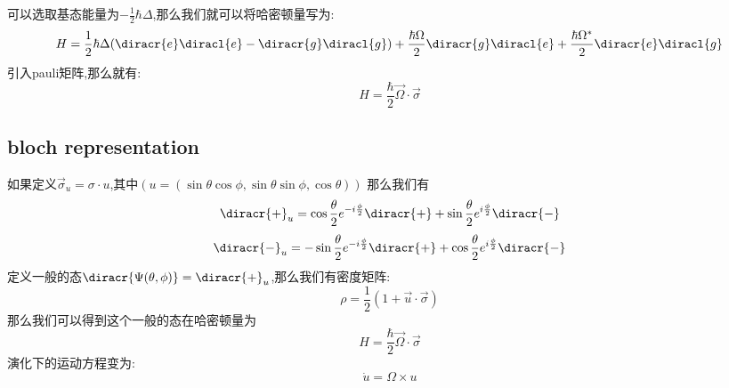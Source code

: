 可以选取基态能量为$-\frac{1}{2}\hbar\Delta$,那么我们就可以将哈密顿量写为:
\[H=\frac{1}{2}\hbar\Delta(\diracr{e}\diracl{e}-\diracr{g}\diracl{g})+\frac{\hbar\Omega}{2}\diracr{g}\diracl{e}+\frac{\hbar\Omega^*}{2}\diracr{e}\diracl{g}\]
引入pauli矩阵,那么就有:
\[H=\frac{\hbar}{2}\vec{\Omega}\cdot\vec{\sigma}\]

\subsection{bloch representation}
如果定义$\vec{\sigma}_u=\sigma\cdot u$,其中$(u=(\sin\theta\cos\phi,\sin\theta\sin\phi,\cos\theta))$
那么我们有
\[\diracr{+}_u=\cos\frac{\theta}{2}e^{-i\frac{\phi}{2}}\diracr{+}+\sin\frac{\theta}{2}e^{i\frac{\phi}{2}}\diracr{-}\]
\[\diracr{-}_u=-\sin\frac{\theta}{2}e^{-i\frac{\phi}{2}}\diracr{+}+\cos\frac{\theta}{2}e^{i\frac{\phi}{2}}\diracr{-}\]
定义一般的态$\diracr{\Psi(\theta,\phi)}=\diracr{+}_u$,那么我们有密度矩阵:
\[\rho=\frac{1}{2}(1+\vec{u}\cdot \vec{\sigma})\]
那么我们可以得到这个一般的态在哈密顿量为
\[H=\frac{\hbar}{2}\vec{\Omega}\cdot\vec{\sigma}\]
演化下的运动方程变为:
\[\dot{u}=\Omega\times u\]